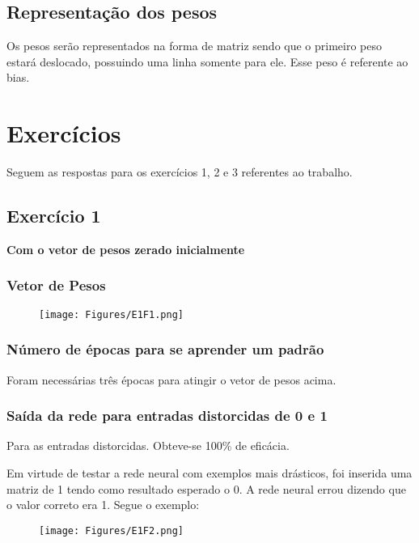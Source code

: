 \documentclass[hidelinks,12pt]{article}
\begin{document}
	\subsection{Representação dos pesos}
		
		Os pesos serão representados na forma de matriz sendo que o primeiro peso estará deslocado, possuindo uma linha somente para ele. Esse peso é referente ao bias.
		
\section{Exercícios}

	Seguem as respostas para os exercícios 1, 2 e 3 referentes ao trabalho.
	
	
	\subsection{Exercício 1}
		
		\textbf{\large Com o vetor de pesos zerado inicialmente}
		
		\subsubsection{Vetor de Pesos}
		\begin{figure}[!h]
			\centering
			\texttt{[image: Figures/E1F1.png]}
		\end{figure}
		
		\subsubsection{Número de épocas para se aprender um padrão}
		
		Foram necessárias três épocas para atingir o vetor de pesos acima.
		
		\subsubsection{Saída da rede para entradas distorcidas de 0 e 1}
		
		Para as entradas distorcidas. Obteve-se 100\% de eficácia.
		
		Em virtude de testar a rede neural com exemplos mais drásticos, foi inserida uma matriz de 1 tendo como resultado esperado o 0. A rede neural errou dizendo que o valor correto era 1. Segue o exemplo:
		
		\begin{figure}[!h]
			\centering
			\texttt{[image: Figures/E1F2.png]}
		\end{figure}
		
\end{document}
